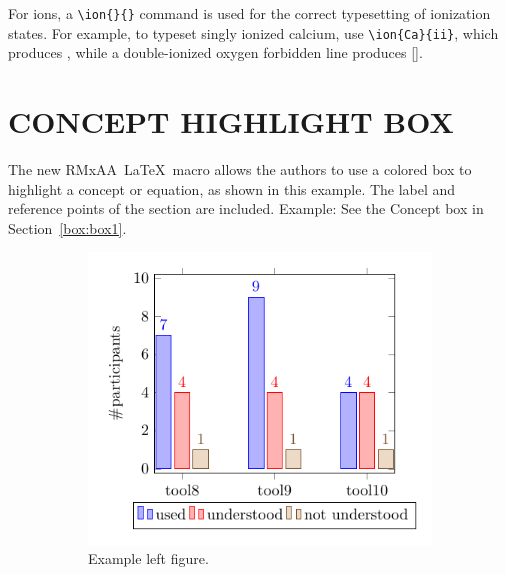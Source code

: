 \documentclass[9pt,article,twoside]{rmaa-rho-class/rmaa-rho}
\newcommand\rmaatex{RMxAA~\LaTeX}
\begin{document}
        For ions, a \verb'\ion{}{}' command is used for the correct typesetting of ionization states. For example, to typeset singly ionized calcium, use \verb'\ion{Ca}{ii}', which produces , while a double-ionized oxygen forbidden line produces [].


    \section{CONCEPT HIGHLIGHT BOX} 

    The new \rmaatex\ macro allows the authors to use a colored box to highlight a concept or equation, as shown in this example. The label and reference points of the section are included. Example: See the Concept box in Section~\ref{box:box1}.  


    \begin{figure}[ht]
        \centering
        \begin{subfigure}[b]{0.38\linewidth} %
            \includegraphics[width=\linewidth]{figures/bar-plot.pdf}
            \caption{Example left figure.}
            \label{fig:figa}
        \end{subfigure}
        \hspace{15pt}   %
        \begin{subfigure}[b]{0.38\linewidth} %
            \centering

\end{subfigure}
\end{figure}
\end{document}
